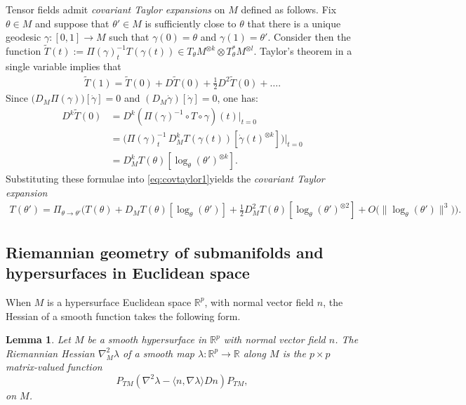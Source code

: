 \documentclass{article}
\newcommand{\RB}{\mathbb{R}}
\theoremstyle{plain}
\newtheorem{lemma}[theorem]{Lemma}
\theoremstyle{definition}
\theoremstyle{remark}
\begin{document}
Tensor fields admit \emph{covariant Taylor expansions} on $M$ defined as follows. Fix $\theta\in M$ and suppose that $\theta'\in M$ is sufficiently close to $\theta$ that there is a unique geodesic $\gamma:[0,1]\rightarrow M$ such that $\gamma(0) = \theta$ and $\gamma(1) = \theta'$. Consider then the function $\widetilde{T}(t):=\Pi(\gamma)_{t}^{-1}T(\gamma(t))\in T_{\theta}M^{\otimes k}\otimes T^*_{\theta}M^{\otimes l}$. Taylor's theorem in a single variable implies that
\begin{align}
    \widetilde{T}(1) = \widetilde{T}(0) + D\widetilde{T}(0) + \frac{1}{2}D^2\widetilde{T}(0) + \dots.\label{eq:covtaylor1}
\end{align}
Since $\big(D_M\Pi(\gamma)\big)[\dot{\gamma}] = 0$ and $(D_M\dot{\gamma})[\dot{\gamma}] = 0$, one has:
\begin{align}
    D^k\widetilde{T}(0) &= D^k(\Pi(\gamma)^{-1}\circ T\circ \gamma)(t)|_{t=0}\\ &= \big(\Pi(\gamma)_t^{-1}\, D^k_MT(\gamma(t))[\dot{\gamma}(t)^{\otimes k}]\big)|_{t=0}\\ &= D^k_MT(\theta)[\log_{\theta}(\theta')^{\otimes k}].
\end{align}
Substituting these formulae into \eqref{eq:covtaylor1}yields the \emph{covariant Taylor expansion}
\begin{align}
    T(\theta') = \Pi_{\theta\rightarrow\theta'}\bigg(T(\theta) + D_MT(\theta)[\log_{\theta}(\theta')] + \frac{1}{2}D_M^2T(\theta)[\log_{\theta}(\theta')^{\otimes 2}]+O\big(\|\log_{\theta}(\theta')\|^3\big)\bigg).\label{eq:covtaylor2}
\end{align}

\subsection{Riemannian geometry of submanifolds and hypersurfaces in Euclidean space}

When $M$ is a hypersurface Euclidean space $\RB^p$, with normal vector field $n$, the Hessian of a smooth function takes the following form.

\begin{lemma}\label{lem:riemhess}
    Let $M$ be a smooth hypersurface in $\RB^p$ with normal vector field $n$. The Riemannian Hessian $\nabla^2_M\lambda$ of a smooth map $\lambda:\RB^p\rightarrow\RB$ along $M$ is the $p\times p$ matrix-valued function
    \begin{equation}
        P_{TM}(\nabla^2\lambda -\langle n,\nabla\lambda\rangle Dn)P_{TM},
    \end{equation}
    on $M$.
\end{lemma}
\end{document}
